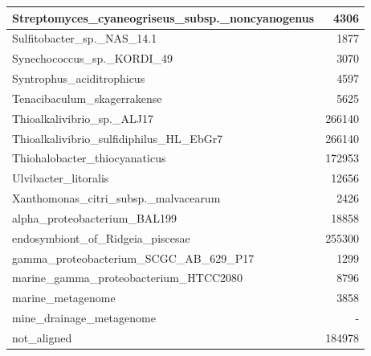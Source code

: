 \documentclass[12pt,a4paper]{article}
\begin{document}
\begin{table}[ht]
\begin{center}
\begin{tabular}{|l*{1}{|r}|}
Streptomyces\_cyaneogriseus\_subsp.\_noncyanogenus & 4306 \\ \hline
Sulfitobacter\_sp.\_NAS\_14.1 & 1877 \\ \hline
Synechococcus\_sp.\_KORDI\_49 & 3070 \\ \hline
Syntrophus\_aciditrophicus & 4597 \\ \hline
Tenacibaculum\_skagerrakense & 5625 \\ \hline
Thioalkalivibrio\_sp.\_ALJ17 & 266140 \\ \hline
Thioalkalivibrio\_sulfidiphilus\_HL\_EbGr7 & 266140 \\ \hline
Thiohalobacter\_thiocyanaticus & 172953 \\ \hline
Ulvibacter\_litoralis & 12656 \\ \hline
Xanthomonas\_citri\_subsp.\_malvacearum & 2426 \\ \hline
alpha\_proteobacterium\_BAL199 & 18858 \\ \hline
endosymbiont\_of\_Ridgeia\_piscesae & 255300 \\ \hline
gamma\_proteobacterium\_SCGC\_AB\_629\_P17 & 1299 \\ \hline
marine\_gamma\_proteobacterium\_HTCC2080 & 8796 \\ \hline
marine\_metagenome & 3858 \\ \hline
mine\_drainage\_metagenome & - \\ \hline
not\_aligned & 184978 \\ \hline
\end{tabular}
\end{center}
\end{table}
\end{document}
